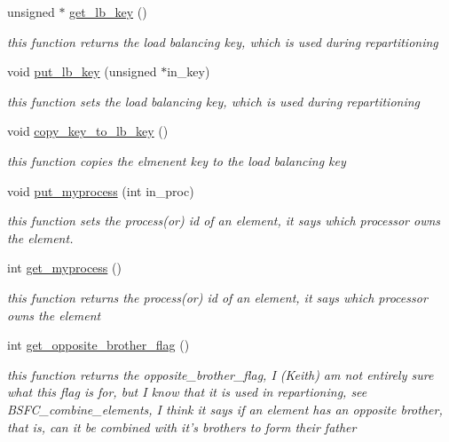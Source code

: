 \begin{CompactItemize}
unsigned $\ast$ \hyperlink{classElement_a56}{get\_\-lb\_\-key} ()
\begin{CompactList}\small\item\em this function returns the load balancing key, which is used during repartitioning \item\end{CompactList}\item 
void \hyperlink{classElement_a57}{put\_\-lb\_\-key} (unsigned $\ast$in\_\-key)
\begin{CompactList}\small\item\em this function sets the load balancing key, which is used during repartitioning \item\end{CompactList}\item 
void \hyperlink{classElement_a58}{copy\_\-key\_\-to\_\-lb\_\-key} ()
\begin{CompactList}\small\item\em this function copies the elmenent key to the load balancing key \item\end{CompactList}\item 
void \hyperlink{classElement_a59}{put\_\-myprocess} (int in\_\-proc)
\begin{CompactList}\small\item\em this function sets the process(or) id of an element, it says which processor owns the element. \item\end{CompactList}\item 
int \hyperlink{classElement_a60}{get\_\-myprocess} ()
\begin{CompactList}\small\item\em this function returns the process(or) id of an element, it says which processor owns the element \item\end{CompactList}\item 
int \hyperlink{classElement_a61}{get\_\-opposite\_\-brother\_\-flag} ()
\begin{CompactList}\small\item\em this function returns the opposite\_\-brother\_\-flag, I (Keith) am not entirely sure what this flag is for, but I know that it is used in repartioning, see BSFC\_\-combine\_\-elements, I think it says if an element has an opposite brother, that is, can it be combined with it's brothers to form their father \item\end{CompactList}\item 

\end{CompactItemize}

